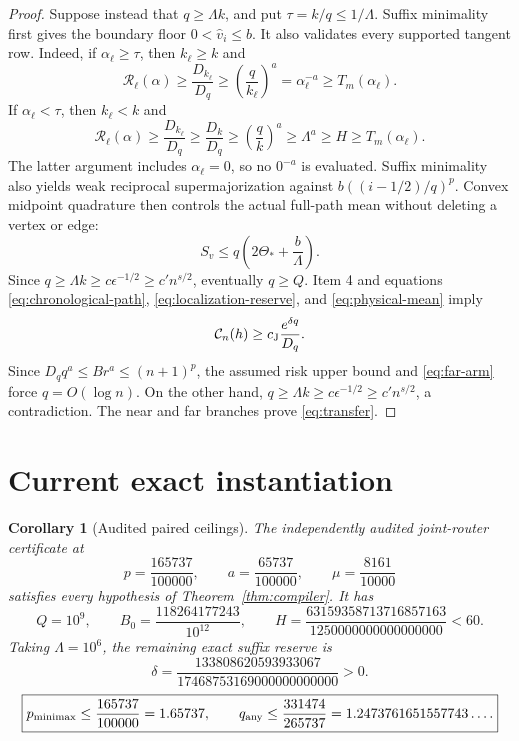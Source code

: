 \documentclass[11pt]{article}
\newtheorem{corollary}[theorem]{Corollary}
\theoremstyle{remark}
\begin{document}
\begin{proof}
Suppose instead that \(q\ge\Lambda k\), and put \(\tau=k/q\le1/\Lambda\).
Suffix minimality first gives the boundary floor
\(0<\widehat v_i\le b\).  It also validates every supported tangent row.
Indeed, if \(\alpha_\ell\ge\tau\), then \(k_\ell\ge k\) and
\[
 \mathscr R_\ell(\alpha)\ge\frac{D_{k_\ell}}{D_q}
 \ge\left(\frac q{k_\ell}\right)^a
 =\alpha_\ell^{-a}\ge T_m(\alpha_\ell).
\]
If \(\alpha_\ell<\tau\), then \(k_\ell<k\) and
\[
 \mathscr R_\ell(\alpha)\ge\frac{D_{k_\ell}}{D_q}
 \ge\frac{D_k}{D_q}\ge\left(\frac qk\right)^a
 \ge\Lambda^a\ge H\ge T_m(\alpha_\ell).
\]
The latter argument includes \(\alpha_\ell=0\), so no \(0^{-a}\) is
evaluated.  Suffix minimality also yields weak reciprocal supermajorization
against \(b((i-1/2)/q)^p\).  Convex midpoint quadrature then controls the
actual full-path mean without deleting a vertex or edge:
\begin{equation}
 S_v\le q\left(2\Theta_*+\frac b\Lambda\right).
 \label{eq:physical-mean}
\end{equation}
Since \(q\ge\Lambda k\ge c\epsilon^{-1/2}\ge c'n^{s/2}\), eventually
\(q\ge Q\).  Item 4 and equations \eqref{eq:chronological-path},
\eqref{eq:localization-reserve}, and \eqref{eq:physical-mean} imply
\begin{equation}
 \mathcal C_n(h)\ge c_{\rm J}\frac{e^{\delta q}}{D_q}.
 \label{eq:far-arm}
\end{equation}
Since \(D_qq^a\le Br^a\le(n+1)^p\), the assumed risk upper bound and
\eqref{eq:far-arm} force \(q=O(\log n)\).  On the other hand,
\(q\ge\Lambda k\ge c\epsilon^{-1/2}\ge c'n^{s/2}\), a contradiction.
The near and far branches prove \eqref{eq:transfer}.
\end{proof}

\section{Current exact instantiation}

\begin{corollary}[Audited paired ceilings]
\label{cor:instantiation}
The independently audited joint-router certificate at
\[
 p=\frac{165737}{100000},\qquad
 a=\frac{65737}{100000},\qquad
 \mu=\frac{8161}{10000}
\]
satisfies every hypothesis of Theorem~\ref{thm:compiler}.  It has
\[
 Q=10^9,\qquad
 B_0=\frac{118264177243}{10^{12}},\qquad
 H=\frac{63159358713716857163}{1250000000000000000}<60.
\]
Taking \(\Lambda=10^6\), the remaining exact suffix reserve is
\[
 \delta=
 \frac{133808620593933067}
 {17468753169000000000000}>0.
\]
\begin{equation}
 \boxed{
 p_{\rm minimax}\le\frac{165737}{100000}=1.65737,
 \qquad
 q_{\rm any}\le\frac{331474}{265737}
 =1.2473761651557743\ldots .}
 \label{eq:paired-result}
\end{equation}
\end{corollary}
\end{document}
